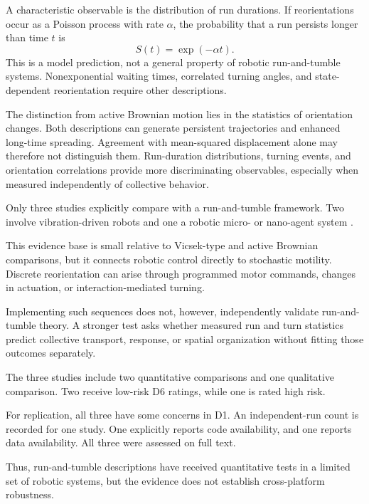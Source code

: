 A characteristic observable is the distribution
of run durations. If reorientations occur as
a Poisson process with rate $\alpha$,
the probability that a run persists
longer than time $t$ is
\begin{equation}
S(t)=\exp(-\alpha t).
\label{eq:theory-run-tumble}
\end{equation}
This is a model prediction, not a general
property of robotic run-and-tumble systems.
Nonexponential waiting times, correlated
turning angles, and state-dependent
reorientation require other descriptions.

The distinction from active Brownian motion
lies in the statistics of orientation changes.
Both descriptions can generate persistent
trajectories and enhanced long-time spreading.
Agreement with mean-squared displacement alone
may therefore not distinguish them.
Run-duration distributions, turning events,
and orientation correlations provide
more discriminating observables,
especially when measured independently
of collective behavior.

Only three studies explicitly compare
with a run-and-tumble framework.
Two involve vibration-driven robots
and one a robotic micro- or nano-agent
system
\cite{Noirhomme2024brainbotsassmarta,Raghavendra2026programmablepersist,Balda2024playingwithactive}.

This evidence base is small relative
to Vicsek-type and active Brownian
comparisons, but it connects robotic
control directly to stochastic motility.
Discrete reorientation can arise
through programmed motor commands,
changes in actuation, or
interaction-mediated turning.

Implementing such sequences does not,
however, independently validate
run-and-tumble theory. A stronger
test asks whether measured run and
turn statistics predict collective
transport, response, or spatial
organization without fitting those
outcomes separately.

The three studies include two
quantitative comparisons and
one qualitative comparison.
Two receive low-risk D6 ratings,
while one is rated high risk.

For replication, all three have
some concerns in D1.
An independent-run count is
recorded for one study.
One explicitly reports code
availability, and one reports
data availability.
All three were assessed
on full text.

Thus, run-and-tumble descriptions
have received quantitative tests
in a limited set of robotic systems,
but the evidence does not establish
cross-platform robustness.

